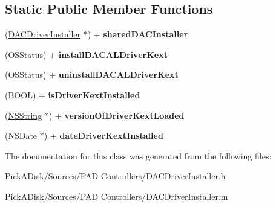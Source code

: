 \subsection*{Static Public Member Functions}
\begin{DoxyCompactItemize}
\item 
\hypertarget{interface_d_a_c_driver_installer_a912f619aca50893c47b734530280c019}{
(\hyperlink{interface_d_a_c_driver_installer}{DACDriverInstaller} $\ast$) + {\bfseries sharedDACInstaller}}
\label{interface_d_a_c_driver_installer_a912f619aca50893c47b734530280c019}

\item 
\hypertarget{interface_d_a_c_driver_installer_a01b1c34fdc0b8a4eda3fd0c259c218df}{
(OSStatus) + {\bfseries installDACALDriverKext}}
\label{interface_d_a_c_driver_installer_a01b1c34fdc0b8a4eda3fd0c259c218df}

\item 
\hypertarget{interface_d_a_c_driver_installer_a72ca88e73dd6652fa4da36913e312d9c}{
(OSStatus) + {\bfseries uninstallDACALDriverKext}}
\label{interface_d_a_c_driver_installer_a72ca88e73dd6652fa4da36913e312d9c}

\item 
\hypertarget{interface_d_a_c_driver_installer_a43cbed358b5ac76e33684561d50e125a}{
(BOOL) + {\bfseries isDriverKextInstalled}}
\label{interface_d_a_c_driver_installer_a43cbed358b5ac76e33684561d50e125a}

\item 
\hypertarget{interface_d_a_c_driver_installer_abe9f783a24dca8395a6aa5bb5a99e5c6}{
(\hyperlink{class_n_s_string}{NSString} $\ast$) + {\bfseries versionOfDriverKextLoaded}}
\label{interface_d_a_c_driver_installer_abe9f783a24dca8395a6aa5bb5a99e5c6}

\item 
\hypertarget{interface_d_a_c_driver_installer_a08c6220ac8f6e1aba35963b45f015cba}{
(NSDate $\ast$) + {\bfseries dateDriverKextInstalled}}
\label{interface_d_a_c_driver_installer_a08c6220ac8f6e1aba35963b45f015cba}

\end{DoxyCompactItemize}


The documentation for this class was generated from the following files:\begin{DoxyCompactItemize}
\item 
PickADisk/Sources/PAD Controllers/DACDriverInstaller.h\item 
PickADisk/Sources/PAD Controllers/DACDriverInstaller.m\end{DoxyCompactItemize}
